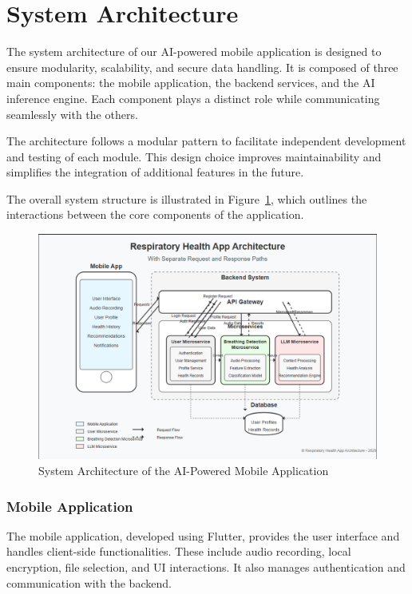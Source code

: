 \section{System Architecture}
\label{sec:system_architecture}

The system architecture of our AI-powered mobile application is designed to ensure modularity, scalability, and secure data handling. It is composed of three main components: the mobile application, the backend services, and the AI inference engine. Each component plays a distinct role while communicating seamlessly with the others.

The architecture follows a modular pattern to facilitate independent development and testing of each module. This design choice improves maintainability and simplifies the integration of additional features in the future.

The overall system structure is illustrated in Figure~\ref{fig:system-architecture}, which outlines the interactions between the core components of the application.


\begin{figure}[H]
    \centering
    \includegraphics[width=\textwidth]{images/architecture.png}
    \caption{System Architecture of the AI-Powered Mobile Application}
    \label{fig:system-architecture}
\end{figure}

\subsubsection*{Mobile Application}

The mobile application, developed using Flutter, provides the user interface and handles client-side functionalities. These include audio recording, local encryption, file selection, and UI interactions. It also manages authentication and communication with the backend.

